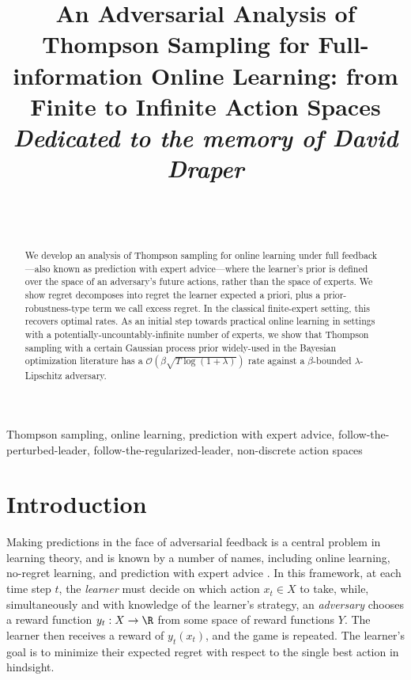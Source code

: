 \documentclass[preprint,12pt]{colt2025}
\title[An Adversarial Analysis of Thompson Sampling for Full-information Online Learning]{An Adversarial Analysis of Thompson Sampling for Full-information Online Learning: from Finite to Infinite Action Spaces\\[6pt]\normalfont\large\slshape Dedicated to the memory of David Draper}
\author[Terenin and Negrea]{
\Name{Alexander Terenin} \\
\addr{Cornell University}
\AND
\Name{Jeffrey Negrea} \\
\addr{University of Waterloo and the Vector Institute}
}
\begin{document}
\maketitle

\begin{abstract}
We develop an analysis of Thompson sampling for online learning under full feedback---also known as prediction with expert advice---where the learner's prior is defined over the space of an adversary's future actions, rather than the space of experts. We show regret decomposes into regret the learner expected a priori, plus a prior-robustness-type term we call excess regret. In the classical finite-expert setting, this recovers optimal rates. As an initial step towards practical online learning in settings with a potentially-uncountably-infinite number of experts, we show that Thompson sampling with a certain Gaussian process prior widely-used in the Bayesian optimization literature has a $\mathcal{O}(\beta\sqrt{T\log(1+\lambda)})$ rate against a $\beta$-bounded $\lambda$-Lipschitz adversary.
\end{abstract}

\vspace{0.5\baselineskip}

\begin{keywords}\ignorespaces
Thompson sampling, online learning, prediction with expert advice, follow-the-perturbed-leader, follow-the-regularized-leader, non-discrete action spaces
\end{keywords}


\section{Introduction} 

Making predictions in the face of adversarial feedback is a central problem in learning theory, and is known by a number of names, including online learning, no-regret learning, and prediction with expert advice \cite{cesabianchi2006prediction}.
In this framework, at each time step $t$, the \emph{learner} must decide on which action $x_t \in X$ to take, while, simultaneously and with knowledge of the learner's strategy, an \emph{adversary} chooses a reward function $y_t : X \to \R$ from some space of reward functions $Y$.
The learner then receives a reward of $y_t(x_t)$, and the game is repeated.
The learner's goal is to minimize their expected regret with respect to the single best action in hindsight.
\end{document}
